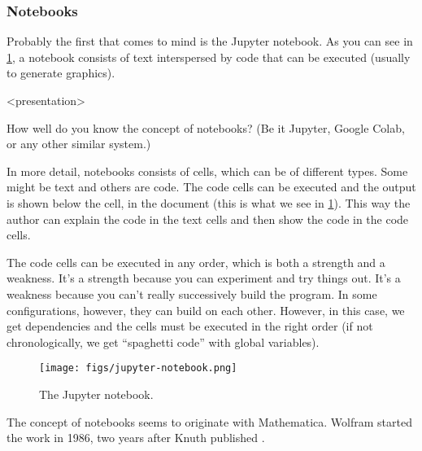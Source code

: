 \subsubsection{Notebooks}

Probably the first that comes to mind is the Jupyter notebook.
As you can see in \cref{fig:jupyter}, a notebook consists of text interspersed 
by code that can be executed (usually to generate graphics).

\begin{frame}<presentation>
\begin{activity}\label{AnalyseNotebooks}
How well do you know the concept of notebooks?
(Be it Jupyter, Google Colab, or any other similar system.)
\end{activity}
\end{frame}

In more detail, notebooks consists of cells, which can be of different types.
Some might be text and others are code.
The code cells can be executed and the output is shown below the cell, in the 
document (this is what we see in \cref{fig:jupyter}).
This way the author can explain the code in the text cells and then show the 
code in the code cells.

The code cells can be executed in any order, which is both a strength and a 
weakness.
It's a strength because you can experiment and try things out.
It's a weakness because you can't really successively build the program.
In some configurations, however, they can build on each other.
However, in this case, we get dependencies and the cells must be executed in 
the right order (if not chronologically, we get \enquote{spaghetti code} with 
global variables).

\begin{frame}
\begin{figure}[b]
  \texttt{[image: figs/jupyter-notebook.png]}
  \caption{\label{fig:jupyter}%
    The Jupyter notebook.
  }
\end{figure}
\end{frame}

\begin{frame}
\begin{remark}
  The concept of notebooks seems to originate with 
  Mathematica\autocite{Wolfram1988}.
  Wolfram started the work in 1986, two years after Knuth published 
  .
\end{remark}
\end{frame}


